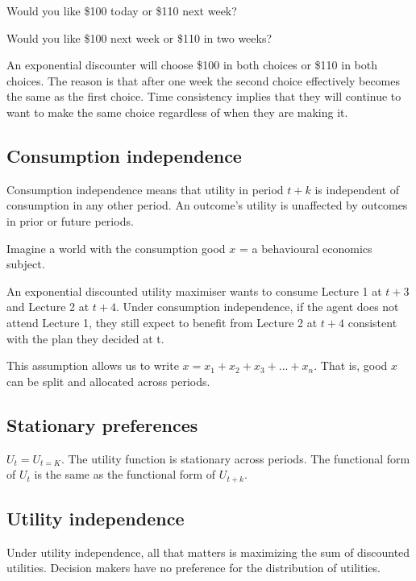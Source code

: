 \documentclass[
  letterpaper,
  DIV=11,
  numbers=noendperiod]{scrreprt}
\begin{document}
Would you like \$100 today or \$110 next week?

Would you like \$100 next week or \$110 in two weeks?

An exponential discounter will choose \$100 in both choices or \$110 in
both choices. The reason is that after one week the second choice
effectively becomes the same as the first choice. Time consistency
implies that they will continue to want to make the same choice
regardless of when they are making it.

\hypertarget{consumption-independence}{%
\subsection{Consumption independence}\label{consumption-independence}}

Consumption independence means that utility in period \(t+k\) is
independent of consumption in any other period. An outcome's utility is
unaffected by outcomes in prior or future periods.

Imagine a world with the consumption good \(x\) = a behavioural
economics subject.

An exponential discounted utility maximiser wants to consume Lecture 1
at \(t+3\) and Lecture 2 at \(t+4\). Under consumption independence, if
the agent does not attend Lecture 1, they still expect to benefit from
Lecture 2 at \(t+4\) consistent with the plan they decided at t.

This assumption allows us to write \(x=x_1+x_2+x_3+...+x_n\). That is,
good \(x\) can be split and allocated across periods.

\hypertarget{stationary-preferences}{%
\subsection{Stationary preferences}\label{stationary-preferences}}

\(U_t=U_{t=K}\). The utility function is stationary across periods. The
functional form of \(U_t\) is the same as the functional form of
\(U_{t+k}\).

\hypertarget{utility-independence}{%
\subsection{Utility independence}\label{utility-independence}}

Under utility independence, all that matters is maximizing the sum of
discounted utilities. Decision makers have no preference for the
distribution of utilities.
\end{document}
